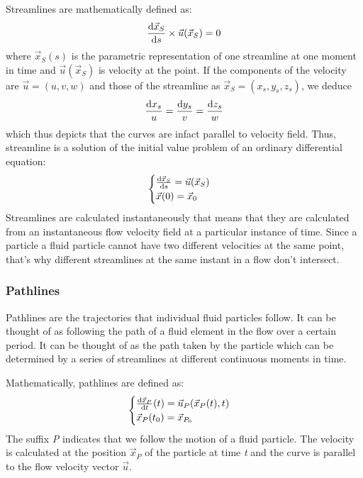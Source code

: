 Streamlines are mathematically defined as:
\begin{equation}
	\frac{\mathop{}\!\mathrm{d} \vec{x}_{S}}{\mathop{}\!\mathrm{d} s} \times \vec{u}(\vec{x}_{S}) = 0
\end{equation}
where $\vec{x}_{S}(s)$ is the parametric representation of one streamline at one moment in time and $\vec{u}(\vec{x}_{S})$ is velocity at the point.
If the components of the velocity are $ \vec{u} = (u,v,w)$ and those of the streamline as $ \vec{x}_{S} = (x_{s},y_{s},z_{s}) $, we deduce
\begin{equation}
	\frac{\mathop{}\!\mathrm{d} x_{s}}{u} = \frac{\mathop{}\!\mathrm{d} y_{s}}{v} = \frac{\mathop{}\!\mathrm{d} z_{s}}{w}
\end{equation}
which thus depicts that the curves are infact parallel to velocity field. Thus, streamline is a solution of the initial value problem of an ordinary differential equation:
\begin{equation}
	\begin{cases}
	 \frac{\mathop{}\!\mathrm{d} \vec{x}_{S}}{\mathop{}\!\mathrm{d} s} = \vec{u}(\vec{x}_{S}) \\
	 \vec{x}(0) = \vec{x}_{0}
	\end{cases}
\end{equation}
Streamlines are calculated instantaneously that means that they are calculated from an instantaneous flow velocity field at a particular instance of time. Since a particle a fluid particle cannot have two different velocities at the same point, that's why different streamlines at the same instant in a flow don't intersect. 

\subsubsection{Pathlines}
Pathlines are the trajectories that individual fluid particles follow. It can be thought of as following the path of a fluid element in the flow over a certain period. It can be thought of as the path taken by the particle which can be determined by a series of streamlines at different continuous moments in time. 

Mathematically, pathlines are defined as:
\begin{equation}
	\begin{cases}
		\frac{\mathop{}\!\mathrm{d} \vec{x}_{P}}{\mathop{}\!\mathrm{d} t}(t) = \vec{u}_{P}(\vec{x}_{P}(t),t) \\
		\vec{x}_{P}(t_{0}) = \vec{x}_{P_{0}}
	\end{cases}
\end{equation}
The suffix \textit{P} indicates that we follow the motion of a fluid particle. The velocity is calculated at the position $ \vec{x}_{P} $ of the particle at time \textit{t} and the curve is parallel to the flow velocity vector $\vec{u}$.

